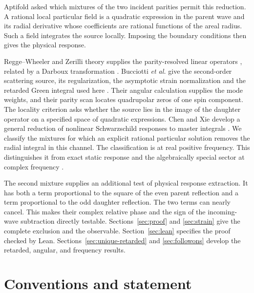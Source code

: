 \documentclass[11pt]{article}
\begin{document}
Aptifold asked which mixtures of the two incident parities permit this reduction. A rational local particular field is a quadratic expression in the parent wave and its radial derivative whose coefficients are rational functions of the areal radius. Such a field integrates the source locally. Imposing the boundary conditions then gives the physical response.

Regge--Wheeler and Zerilli theory supplies the parity-resolved linear operators \cite{reggewheeler,zerilli}, related by a Darboux transformation \cite{darboux}.
Bucciotti \emph{et al.} give the second-order scattering source, its regularization, the asymptotic strain normalization and the retarded Green integral used here \cite{bucciotti}. Their angular calculation supplies the mode weights, and their parity scan locates quadrupolar zeros of one spin component.
The locality criterion asks whether the source lies in the image of the daughter operator on a specified space of quadratic expressions.
Chen and Xie develop a general reduction of nonlinear Schwarzschild responses to master integrals \cite{chenxie}.
We classify the mixtures for which an explicit rational particular solution removes the radial integral in this channel. The classification is at real positive frequency. This distinguishes it from exact static response and the algebraically special sector at complex frequency \cite{iteanu,special}.

The second mixture supplies an additional test of physical response extraction.
It has both a term proportional to the square of the even parent reflection and a term proportional to the odd daughter reflection.
The two terms can nearly cancel.
This makes their complex relative phase and the sign of the incoming-wave subtraction directly testable.
Sections~\ref{sec:proof} and \ref{sec:strain} give the complete exclusion and the observable. Section~\ref{sec:lean} specifies the proof checked by Lean. Sections~\ref{sec:unique-retarded} and \ref{sec:followons} develop the retarded, angular, and frequency results.



\section{Conventions and statement}
\label{sec:conventions}
\end{document}
